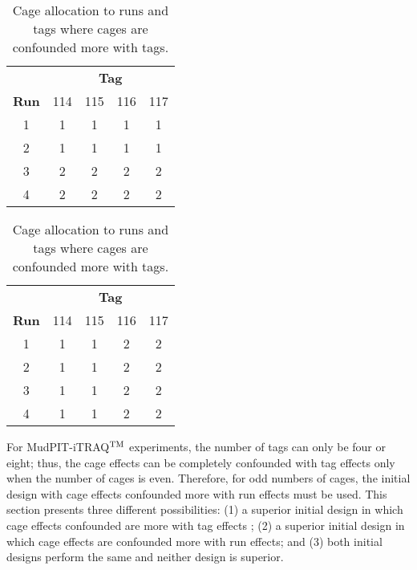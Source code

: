 \begin{table}[ht]                                       
\centering 
\itshape                                             
\caption{Cage allocation to runs and tags where cages are confounded more with runs.}               
\begin{tabular}[t]{c|cccc}                                 
 & \multicolumn{4}{c}{{\bf Tag}} \\                     
{\bf Run}  & \textnormal{114} & \textnormal{115} & \textnormal{116} & \textnormal{117} \\ 
\hline                                                     
\textnormal{1}  & 1 & 1 & 1 & 1 \\  
\textnormal{2}  & 1 & 1 & 1 & 1 \\  
\textnormal{3}  & 2 & 2 & 2 & 2 \\  
\textnormal{4}  & 2 & 2 & 2 & 2 \\     
\end{tabular}                                           
\label{tab:initialCag1}                                  
                                      
\caption{Cage allocation to runs and tags where cages are confounded more with tags.}           
\begin{tabular}[t]{c|cccc}                                 
 & \multicolumn{4}{c}{{\bf Tag}} \\                     
{\bf Run}  & \textnormal{114} & \textnormal{115} & \textnormal{116} & \textnormal{117} \\ 
\hline                                                    
\textnormal{1}  & 1 & 1 & 2 & 2 \\  
\textnormal{2}  & 1 & 1 & 2 & 2 \\  
\textnormal{3}  & 1 & 1 & 2 & 2 \\  
\textnormal{4}  & 1 & 1 & 2 & 2 \\     
\end{tabular}                                           
\label{tab:initialCag2}                                  
\end{table}    

For MudPIT-iTRAQ$^{\rm TM}$ experiments, the number of tags can only be four or eight; thus, the cage effects can be completely confounded with tag effects only when the number of cages is even. Therefore, for odd numbers of cages, the initial design with cage effects confounded more with run effects must be used. This section presents three different possibilities: (1) a superior initial design in which cage effects confounded are more with tag effects ; (2) a superior initial design in which cage effects are confounded more with run effects; and (3) both initial designs perform the same and neither design is superior. 

